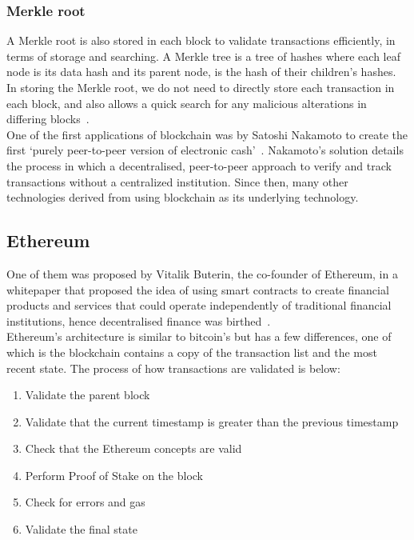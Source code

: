 \subsubsection{Merkle root}
A Merkle root is also stored in each block to validate transactions efficiently, in terms of storage and searching. A Merkle tree is a tree of hashes where each leaf node is its data hash and its parent node, is the hash of their children's hashes. In storing the Merkle root, we do not need to directly store each transaction in each block, and also allows a quick search for any malicious alterations in differing blocks~\cite{noauthor_merkle_nodate}.
\\[5mm]
One of the first applications of blockchain was by Satoshi Nakamoto to create the first `purely peer-to-peer version of electronic cash'~\cite{nakamoto2009bitcoin}. Nakamoto's solution details the process in which a decentralised, peer-to-peer approach to verify and track transactions without a centralized institution. Since then, many other technologies derived from using blockchain as its underlying technology.

\subsection{Ethereum}
One of them was proposed by Vitalik Buterin, the co-founder of Ethereum, in a whitepaper that proposed the idea of using smart contracts to create financial products and services that could operate independently of traditional financial institutions, hence decentralised finance was birthed~\cite{buterin2014next}.
\\[5mm]
Ethereum's architecture is similar to bitcoin's but has a few differences, one of which is the blockchain contains a copy of the transaction list and the most recent state. The process of how transactions are validated is below:
\begin{enumerate}
    \itemsep0em
    \item Validate the parent block
    \item Validate that the current timestamp is greater than the previous timestamp
    \item Check that the Ethereum concepts are valid
    \item Perform Proof of Stake on the block
    \item Check for errors and gas
    \item Validate the final state
\end{enumerate}

